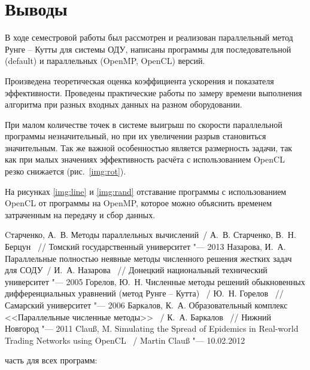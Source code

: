 \documentclass[14pt,final,titlepage,pscyr]{hedwork}
\begin{document}
\newpage

\section{Выводы}
В ходе семестровой работы был рассмотрен и реализован параллельный метод Рунге -- Кутты для системы ОДУ, 
написаны программы для последовательной (default) и параллельных (OpenMP, OpenCL) версий. 

Произведена теоретическая оценка коэффициента ускорения и показателя эффективности. Проведены практические 
работы по замеру времени выполнения алгоритма при разных входных данных на разном оборудовании. 

При малом количестве точек в системе выигрыш по скорости параллельной программы незначительный, но при их 
увеличении разрыв становиться значительным. Так же важной особенностью является размерность задачи, так 
как при малых значениях эффективность расчёта с использованием OpenCL резко снижается (рис.~\ref{img:rot}).

На рисунках \ref{img:line} и \ref{img:rand} отставание программы с использованием OpenCL от программы на 
OpenMP, которое можно объяснить временем затраченным на передачу и сбор данных.

\newpage

\renewcommand{\bibname}{Список используемой литературы}
\begin{thebibliography}{10}
	 Cтарченко, А.~В. Методы параллельных вычислений~/ А.~В. Старченко, В.~Н. Берцун ~// 
		Томский государственный университет "--- 2013
	 Назарова, И.~А. Параллельные полностью неявные методы численного решения жестких 
		задач для СОДУ~/ И.~А. Назарова ~// Донецкий национальный технический университет "--- 2005
	 Горелов, Ю.~Н. Численные методы решений обыкновенных дифференциальных уравнений 
		(метод Рунге -- Кутта) ~/ Ю.~Н. Горелов ~// Самарский университет "--- 2006
	 Баркалов, К.~А. Образовательный комплекс <<Параллельные численные методы>> ~/ 
		К.~А. Баркалов ~// Нижний Новгород "--- 2011
	 Clauß, M. Simulating the Spread of Epidemics in Real-world Trading Networks 
		using OpenCL ~/ Martin Clauß "--- 10.02.2012
\end{thebibliography}

\newpage

\label{sec:app}
 часть для всех программ:

\end{document}

